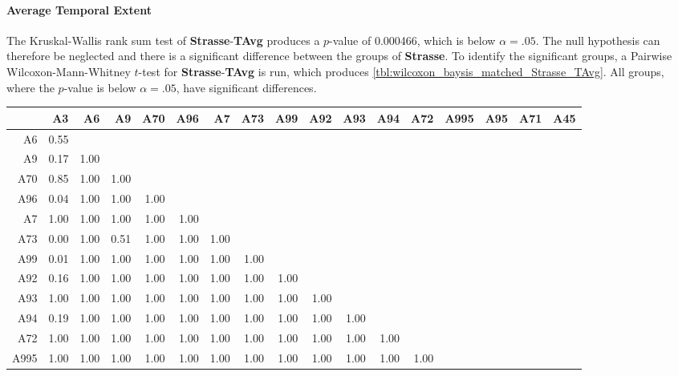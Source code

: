 \paragraph{Average Temporal Extent}
The Kruskal-Wallis rank sum test of \textbf{Strasse}-\textbf{TAvg} produces a $p$-value of 0.000466, which is below $\alpha=.05$. The null hypothesis can therefore be neglected and there is a significant difference between the groups of \textbf{Strasse}. To identify the significant groups, a Pairwise Wilcoxon-Mann-Whitney $t$-test for \textbf{Strasse}-\textbf{TAvg} is run, which produces \autoref{tbl:wilcoxon_baysis_matched_Strasse_TAvg}. All groups, where the $p$-value is below $\alpha=.05$, have significant differences. 
\begin{table}[ht]
	\tiny
	\setlength{\tabcolsep}{4pt}
	\centering
	\begin{tabular}{rrrrrrrrrrrrrrrrr}
		\toprule
				& A3 & A6 & A9 & A70 & A96 & A7 & A73 & A99 & A92 & A93 & A94 & A72 & A995 & A95 & A71 & A45 \\ 
		\midrule
		A6 		& 0.55 &  &  &  &  &  &  &  &  &  &  &  &  &  &  &  \\ 
		A9 		& 0.17 & 1.00 &  &  &  &  &  &  &  &  &  &  &  &  &  &  \\ 
		A70		& 0.85 & 1.00 & 1.00 &  &  &  &  &  &  &  &  &  &  &  &  &  \\ 
		A96 	& 0.04 & 1.00 & 1.00 & 1.00 &  &  &  &  &  &  &  &  &  &  &  &  \\ 
		A7 		& 1.00 & 1.00 & 1.00 & 1.00 & 1.00 &  &  &  &  &  &  &  &  &  &  &  \\ 
		A73 	& 0.00 & 1.00 & 0.51 & 1.00 & 1.00 & 1.00 &  &  &  &  &  &  &  &  &  &  \\ 
		A99 	& 0.01 & 1.00 & 1.00 & 1.00 & 1.00 & 1.00 & 1.00 &  &  &  &  &  &  &  &  &  \\ 
		A92 	& 0.16 & 1.00 & 1.00 & 1.00 & 1.00 & 1.00 & 1.00 & 1.00 &  &  &  &  &  &  &  &  \\ 
		A93 	& 1.00 & 1.00 & 1.00 & 1.00 & 1.00 & 1.00 & 1.00 & 1.00 & 1.00 &  &  &  &  &  &  &  \\ 
		A94 	& 0.19 & 1.00 & 1.00 & 1.00 & 1.00 & 1.00 & 1.00 & 1.00 & 1.00 & 1.00 &  &  &  &  &  &  \\ 
		A72 	& 1.00 & 1.00 & 1.00 & 1.00 & 1.00 & 1.00 & 1.00 & 1.00 & 1.00 & 1.00 & 1.00 &  &  &  &  &  \\ 
		A995 	& 1.00 & 1.00 & 1.00 & 1.00 & 1.00 & 1.00 & 1.00 & 1.00 & 1.00 & 1.00 & 1.00 & 1.00 &  &  &  &  \\ 

\end{tabular}
\end{table}
